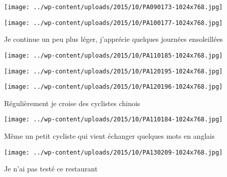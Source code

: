  

\begin{center} \texttt{[image: ../wp-content/uploads/2015/10/PA090173-1024x768.jpg]} \end{center}

 

 

\begin{center} \texttt{[image: ../wp-content/uploads/2015/10/PA100177-1024x768.jpg]} \end{center}

 

 Je continue un peu plus léger, j'apprécie quelques journées ensoleillées 

 

\begin{center} \texttt{[image: ../wp-content/uploads/2015/10/PA110185-1024x768.jpg]} \end{center}

 

 

\begin{center} \texttt{[image: ../wp-content/uploads/2015/10/PA120195-1024x768.jpg]} \end{center}

 

 

\begin{center} \texttt{[image: ../wp-content/uploads/2015/10/PA120196-1024x768.jpg]} \end{center}

 

 Régulièrement je croise des cyclistes chinois 

 

\begin{center} \texttt{[image: ../wp-content/uploads/2015/10/PA110184-1024x768.jpg]} \end{center}

 

 Même un petit cycliste qui vient échanger quelques mots en anglais 

 

\begin{center} \texttt{[image: ../wp-content/uploads/2015/10/PA130209-1024x768.jpg]} \end{center}

 

 Je n'ai pas testé ce restaurant 

